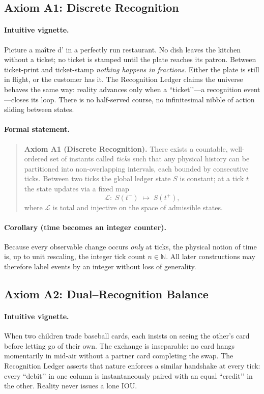 \documentclass[11pt]{article}
\begin{document}
\subsection{Axiom A1: Discrete Recognition}
\label{subsec:axiom-a1}

\paragraph{Intuitive vignette.}
Picture a maître d’ in a perfectly run restaurant.  No dish leaves the kitchen without a ticket; no ticket is stamped until the plate reaches its patron.  Between ticket-print and ticket-stamp \emph{nothing happens in fractions}.  Either the plate is still in flight, or the customer has it.  The Recognition Ledger claims the universe behaves the same way: reality advances only when a “ticket’’—a recognition event—closes its loop.  There is no half-served course, no infinitesimal nibble of action sliding between states.

\paragraph{Formal statement.}
\begin{quote}
\textbf{Axiom A1 (Discrete Recognition).}  
There exists a countable, well-ordered set of instants called \emph{ticks} such that any physical history can be partitioned into non-overlapping intervals, each bounded by consecutive ticks.  Between two ticks the global ledger state \(S\) is constant; at a tick \(t\) the state updates via a fixed map
\[
\mathcal{L}:\;S(t^{-}) \;\longmapsto\; S(t^{+}),
\]
where \(\mathcal{L}\) is total and injective on the space of admissible states.
\end{quote}

\paragraph{Corollary (time becomes an integer counter).}
Because every observable change occurs \emph{only} at ticks, the physical notion of time is, up to unit rescaling, the integer tick count \(n\in\mathbb{N}\).  All later constructions may therefore label events by an integer without loss of generality.
\subsection{Axiom A2: Dual–Recognition Balance}
\label{subsec:axiom-a2}

\paragraph{Intuitive vignette.}
When two children trade baseball cards, each insists on seeing the other’s card before letting go of their own.  The exchange is inseparable: no card hangs momentarily in mid-air without a partner card completing the swap.  The Recognition Ledger asserts that nature enforces a similar handshake at every tick: every “debit’’ in one column is instantaneously paired with an equal “credit’’ in the other.  Reality never issues a lone IOU.
\end{document}
